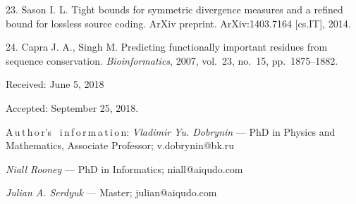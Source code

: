 {23. Sason I. L. Tight bounds for symmetric divergence measures and
a refined bound for lossless source coding. ArXiv preprint.
ArXiv:1403.7164 [cs.IT], 2014.

24. Capra J. A., Singh M. Predicting functionally important
residues from sequence conservation. \textit{Bioinformatics},
2007, vol.~23, no.~15, pp.~1875--1882.

\vskip 1.5mm

%


Received:  June 5, 2018

Accepted: September 25, 2018.


\vskip6mm A\,u\,t\,h\,o\,r's \ i\,n\,f\,o\,r\,m\,a\,t\,i\,o\,n:
\vskip2mm\textit{Vladimir Yu. Dobrynin} --- PhD in Physics and
Mathematics, Associate Professor; v.dobrynin@bk.ru

\vskip2mm\textit{Niall Rooney} --- PhD in Informatics;
niall@aiqudo.com

\vskip2mm\textit{Julian A. Serdyuk} --- Master; julian@aiqudo.com

}

